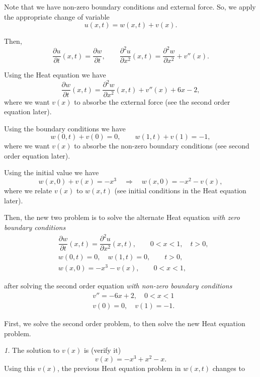 \documentclass[11pt]{article}
\begin{document}
\begin{solution}
Note that we have non-zero boundary conditions and external force. So, we apply the appropriate change of variable
\[u(x,t)=w(x, t)+v(x).\]

Then,
\[\frac{\partial u}{\partial t}(x,t) = \frac{\partial w}{\partial t}, \qquad \frac{\partial^{2} u}{\partial x^{2}}(x, t) = \frac{\partial^{2} w}{\partial x^{2}}+v''(x).\]

Using the Heat equation we have
\[\frac{\partial w}{\partial t}(x,t) = \frac{\partial^{2} w}{\partial x^{2}}(x,t) + v''(x) + 6x -2,\]
where we want $v(x)$ to absorbe the external force (see the second order equation later).

Using the boundary conditions we have
\[w(0, t) + v(0) = 0, \qquad w(1, t) + v(1) = -1,\]
where we want $v(x)$ to absorbe the non-zero boundary conditions (see second order equation later).

Using the initial value we have
\[w(x, 0) + v(x) = -x^{3} \quad \Rightarrow \quad  w(x, 0) = -x^{2} - v(x),\]
where we relate $v(x)$ to $w(x,t)$ (see initial conditions in the Heat equation later).


Then, the new two problem is to solve the alternate Heat equation \textsl{with zero boundary conditions}
\begin{equation*} \begin{split}
& \dfrac{\partial w }{\partial t } (x,t) = \dfrac{\partial^2 u}{\partial x^2}(x,t), \qquad 0<x<1, \quad t>0, \\
& w(0,t) = 0, \quad w(1,t)= 0, \qquad t>0, \\
& w(x,0) = -x^{3} - v(x), \qquad 0<x<1,
\end{split}\end{equation*}

after solving the second order equation \textsl{with non-zero boundary conditions}
\begin{equation*} 
\begin{split}
&v'' = -6x+2, \quad 0< x< 1\\
&v(0) = 0,\quad v(1) = -1.
\end{split}
\end{equation*}

First, we solve the second order problem, to then solve the new Heat equation problem.

\textsl{1. } The solution to $v(x)$ is (verify it)
\[\boxed{v(x) = -x^{3} + x^{2} - x}.\]
Using this $v(x)$, the previous Heat equation problem in $w(x, t)$ changes to



\end{solution}
\end{document}
